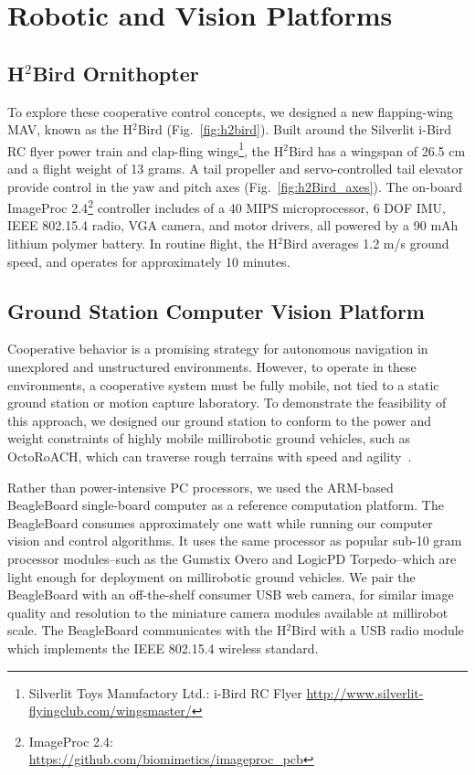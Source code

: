 \documentclass{aamas2013}
\begin{document}
\section{Robotic and Vision Platforms}
\subsection{H$^2$Bird Ornithopter}
To explore these cooperative control concepts, we designed a new 
flapping-wing MAV, known as the H$^2$Bird (Fig.~\ref{fig:h2bird}). Built 
around the Silverlit i-Bird RC flyer power train and clap-fling wings\footnote{\raggedright Silverlit Toys Manufactory Ltd.: i-Bird RC Flyer
\href{http://www.silverlit-flyingclub.com/wingsmaster/}
     {http://www.silverlit-flyingclub.com/wingsmaster/}}, 
the H$^2$Bird has a wingspan of 26.5 cm and a flight weight of 13 grams. A 
tail propeller and servo-controlled tail elevator provide control in the yaw 
and pitch axes (Fig.~\ref{fig:h2Bird_axes}). The on-board ImageProc 2.4\footnote{ImageProc 2.4: \\
\href{https://github.com/biomimetics/imageproc\_pcb}
     {https://github.com/biomimetics/imageproc\_pcb}} 
controller includes of a 40 MIPS microprocessor, 6 DOF IMU, 
IEEE 802.15.4 radio, VGA camera, and motor drivers, all powered by a 90 mAh 
lithium polymer battery. In routine flight, the H$^2$Bird averages 1.2 m/s 
ground speed, and operates for approximately 10 minutes.

\subsection{Ground Station Computer Vision Platform}
Cooperative behavior is a promising strategy for autonomous navigation in 
unexplored and unstructured environments. However, to operate in these 
environments, a cooperative system must be fully mobile, not tied to a 
static ground station or motion capture laboratory. To demonstrate the 
feasibility of this approach, we designed our ground station to conform to 
the power and weight constraints of highly mobile millirobotic ground 
vehicles, such as OctoRoACH, which can traverse rough terrains with speed and 
agility~\cite{Pullin2012Dynamic}. 

Rather than power-intensive PC processors, we used the ARM-based BeagleBoard 
single-board computer as a reference computation platform. The BeagleBoard 
consumes approximately one watt while running our computer vision and 
control algorithms. It uses the same processor as popular sub-10 gram 
processor modules--such as the Gumstix Overo and LogicPD Torpedo--which are 
light enough for deployment on millirobotic ground vehicles. We pair the 
BeagleBoard with an off-the-shelf consumer USB web camera, for similar image 
quality and resolution to the miniature camera modules available at 
millirobot scale. The BeagleBoard communicates with the H$^2$Bird with a 
USB radio module which implements the IEEE 802.15.4 wireless standard.
\end{document}
